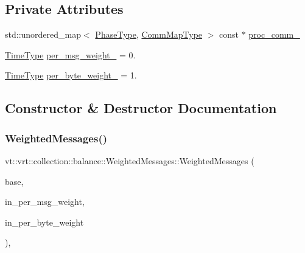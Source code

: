 \subsection*{Private Attributes}
\begin{DoxyCompactItemize}
\item 
std\+::unordered\+\_\+map$<$ \hyperlink{namespacevt_a46ce6733d5cdbd735d561b7b4029f6d7}{Phase\+Type}, \hyperlink{namespacevt_1_1vrt_1_1collection_1_1balance_a01ee1fb0ae2da1d2ab7fdca3be9ae351}{Comm\+Map\+Type} $>$ const  $\ast$ \hyperlink{structvt_1_1vrt_1_1collection_1_1balance_1_1_weighted_messages_a00eed5357188d150d0726e98b683711e}{proc\+\_\+comm\+\_\+}
\item 
\hyperlink{namespacevt_a876a9d0cd5a952859c72de8a46881442}{Time\+Type} \hyperlink{structvt_1_1vrt_1_1collection_1_1balance_1_1_weighted_messages_a4998703cd0f05636559da9c908fafca1}{per\+\_\+msg\+\_\+weight\+\_\+} = 0.
\item 
\hyperlink{namespacevt_a876a9d0cd5a952859c72de8a46881442}{Time\+Type} \hyperlink{structvt_1_1vrt_1_1collection_1_1balance_1_1_weighted_messages_a0c7747d5f3021dc4a89858a99060c095}{per\+\_\+byte\+\_\+weight\+\_\+} = 1.
\end{DoxyCompactItemize}


\subsection{Constructor \& Destructor Documentation}
\mbox{\label{structvt_1_1vrt_1_1collection_1_1balance_1_1_weighted_messages_ac5151d922cbb092e9bea5ccdbf4ff980}} 
\subsubsection{\texorpdfstring{Weighted\+Messages()}{WeightedMessages()}}
{\footnotesize\ttfamily vt\+::vrt\+::collection\+::balance\+::\+Weighted\+Messages\+::\+Weighted\+Messages (\begin{DoxyParamCaption}\item[{std\+::shared\+\_\+ptr$<$ \hyperlink{structvt_1_1vrt_1_1collection_1_1balance_1_1_load_model}{balance\+::\+Load\+Model} $>$}]{base,  }\item[{\hyperlink{namespacevt_a876a9d0cd5a952859c72de8a46881442}{Time\+Type}}]{in\+\_\+per\+\_\+msg\+\_\+weight,  }\item[{\hyperlink{namespacevt_a876a9d0cd5a952859c72de8a46881442}{Time\+Type}}]{in\+\_\+per\+\_\+byte\+\_\+weight }\end{DoxyParamCaption})\hspace{0.3cm}{\ttfamily [inline]}, {\ttfamily [explicit]}}




